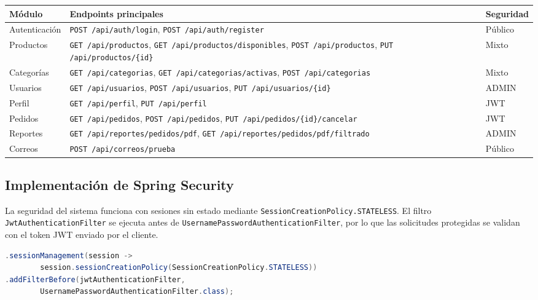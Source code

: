 \documentclass[10pt,a4paper]{article}
\newcommand{\cod}[1]{\texttt{\scriptsize #1}}
\begin{document}
\begin{longtable}{|>{\raggedright\arraybackslash}p{}|
                  >{\raggedright\arraybackslash}p{}|
                  >{\raggedright\arraybackslash}p{}|}
\hline
\rowcolor{cyan!20}
\textbf{Módulo} & \textbf{Endpoints principales} & \textbf{Seguridad}\\
\hline
Autenticación & \texttt{POST /api/auth/login}, \texttt{POST /api/auth/register} & Público\\
\hline
Productos & \texttt{GET /api/productos}, \texttt{GET /api/productos/disponibles}, \texttt{POST /api/productos}, \texttt{PUT /api/productos/\{id\}} & Mixto\\
\hline
Categorías & \texttt{GET /api/categorias}, \texttt{GET /api/categorias/activas}, \texttt{POST /api/categorias} & Mixto\\
\hline
Usuarios & \texttt{GET /api/usuarios}, \texttt{POST /api/usuarios}, \texttt{PUT /api/usuarios/\{id\}} & ADMIN\\
\hline
Perfil & \texttt{GET /api/perfil}, \texttt{PUT /api/perfil} & JWT\\
\hline
Pedidos & \texttt{GET /api/pedidos}, \texttt{POST /api/pedidos}, \texttt{PUT /api/pedidos/\{id\}/cancelar} & JWT\\
\hline
Reportes & \texttt{GET /api/reportes/pedidos/pdf}, \texttt{GET /api/reportes/pedidos/pdf/filtrado} & ADMIN\\
\hline
Correos & \texttt{POST /api/correos/prueba} & Público\\
\hline
\end{longtable}

\subsection{Implementación de Spring Security}

La seguridad del sistema funciona con sesiones sin estado mediante \cod{SessionCreationPolicy.STATELESS}. El filtro \cod{JwtAuthenticationFilter} se ejecuta antes de \cod{UsernamePasswordAuthenticationFilter}, por lo que las solicitudes protegidas se validan con el token JWT enviado por el cliente.

\begin{lstlisting}[language=Java,caption={Registro del filtro JWT en la cadena de seguridad.}]
.sessionManagement(session ->
        session.sessionCreationPolicy(SessionCreationPolicy.STATELESS))
.addFilterBefore(jwtAuthenticationFilter,
        UsernamePasswordAuthenticationFilter.class);
\end{lstlisting}
\end{document}
